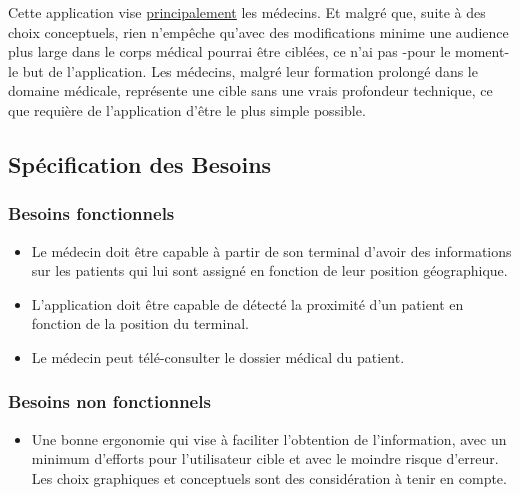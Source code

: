Cette application vise \underline{principalement} les médecins. Et malgré que,
suite à des choix conceptuels, rien n'empêche qu'avec des modifications minime
une audience plus large dans le corps médical pourrai être ciblées, ce n'ai pas
-pour le moment- le but de l'application. Les médecins, malgré leur formation
prolongé dans le domaine médicale, représente une cible sans une vrais
profondeur technique, ce que requière de l'application d'être le plus simple
possible.

\subsection{Spécification des Besoins}
\subsubsection{Besoins fonctionnels}
\begin{itemize}

\item Le médecin doit être capable à partir de son terminal d'avoir des
informations sur les patients qui lui sont assigné en fonction de leur
position géographique.

\item L'application doit être capable de détecté la proximité d'un
patient en fonction de la position du terminal.

\item Le médecin peut télé-consulter le dossier médical du patient.


\end{itemize}

\subsubsection{Besoins non fonctionnels}
\begin{itemize}

\item Une bonne ergonomie qui vise à faciliter l'obtention de
l'information, avec un minimum d'efforts pour l'utilisateur cible et
avec le moindre risque d'erreur. Les choix graphiques et conceptuels
sont des considération à tenir en compte.

\end{itemize}

